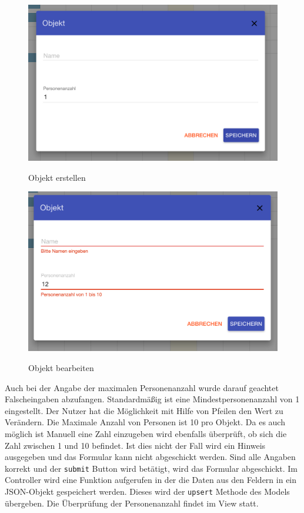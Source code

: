 \begin{figure}[H]
    \centering
    \begin{minipage}[t]{0.49\linewidth}
        \centering
        \includegraphics[width=\linewidth]{images/frontend_resource_new.png}
        \label{frontend_resource_new}
        \caption{Objekt erstellen}
    \end{minipage}%
    \hfill
    \begin{minipage}[t]{0.49\linewidth}
        \centering
        \includegraphics[width=\linewidth]{images/frontend_resource_fail.png}
        \label{frontend_resource_fail}
        \caption{Objekt bearbeiten}
    \end{minipage}
\end{figure}


 Auch bei der Angabe der maximalen Personenanzahl wurde darauf geachtet Falscheingaben abzufangen.
 Standardmäßig ist eine Mindestpersonenanzahl von 1 eingestellt. Der Nutzer hat die Möglichkeit mit Hilfe von Pfeilen den Wert zu Verändern.
 Die Maximale Anzahl von Personen ist 10 pro Objekt. Da es auch möglich ist Manuell eine Zahl einzugeben wird ebenfalls überprüft,
 ob sich die Zahl zwischen 1 und 10 befindet. Ist dies nicht der Fall wird ein Hinweis ausgegeben und das Formular kann nicht abgeschickt werden.
 Sind alle Angaben korrekt und der \texttt{submit} Button wird betätigt, wird das Formular abgeschickt. Im Controller wird eine Funktion aufgerufen in
 der die Daten aus den Feldern in ein JSON-Objekt gespeichert werden. Dieses wird der \texttt{upsert} Methode des Models übergeben. Die Überprüfung der
 Personenanzahl findet im View statt.
 

